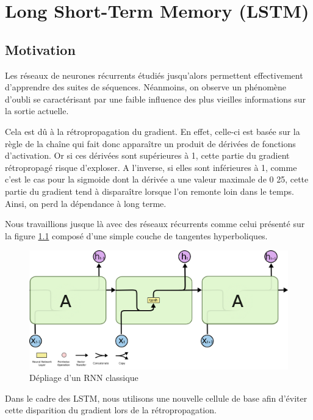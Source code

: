 \documentclass{report}
\theoremstyle{plain}
\theoremstyle{definition}
\theoremstyle{remark}
\begin{document}


\chapter{Long Short-Term Memory (LSTM)}
\section{Motivation}
Les réseaux de neurones récurrents étudiés jusqu'alors permettent effectivement d'apprendre des suites de séquences. Néanmoins, on observe un phénomène d'oubli se caractérisant par une faible influence des plus vieilles informations sur la sortie actuelle.

Cela est dû à la rétropropagation du gradient. En effet, celle-ci est basée sur la règle de la chaîne qui fait donc apparaître un produit de dérivées de fonctions d'activation. Or si ces dérivées sont supérieures à 1, cette partie du gradient rétropropagé risque d'exploser. A l'inverse, si elles sont inférieures à 1, comme c'est le cas pour la sigmoide dont la dérivée a une valeur maximale de 0
25, cette partie du gradient tend à disparaître lorsque l'on remonte loin dans le temps. Ainsi, on perd la dépendance à long terme.

Nous travaillions jusque là avec des réseaux récurrents comme celui présenté sur la figure \ref{RNN classique} composé d'une simple couche de tangentes hyperboliques.

\begin{figure}[h!]
\begin{center}
\includegraphics[scale=0.25]{images/RNN_classique.png}
\caption{Dépliage d'un RNN classique}
\label{RNN classique}
\end{center}
\end{figure}

Dans le cadre des LSTM, nous utilisons une nouvelle cellule de base afin d'éviter cette disparition du gradient lors de la rétropropagation.
\end{document}
